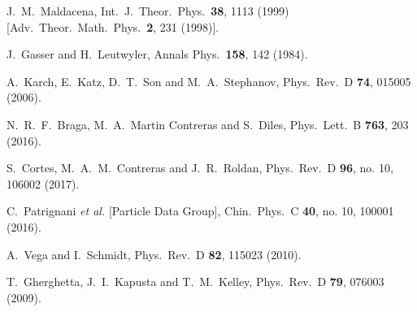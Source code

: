 \documentclass{PoS}
\begin{document}
\begin{thebibliography}{10}

  J.~M.~Maldacena,
  Int.\ J.\ Theor.\ Phys.\  {\bf 38}, 1113 (1999)
  [Adv.\ Theor.\ Math.\ Phys.\  {\bf 2}, 231 (1998)].
	
  J.~Gasser and H.~Leutwyler,
  Annals Phys.\  {\bf 158}, 142 (1984).
	
  A.~Karch, E.~Katz, D.~T.~Son and M.~A.~Stephanov,
  Phys.\ Rev.\ D {\bf 74}, 015005 (2006).
  
  N.~R.~F.~Braga, M.~A.~Martin Contreras and S.~Diles,
  Phys.\ Lett.\ B {\bf 763}, 203 (2016).

  S.~Cortes, M.~A.~M.~Contreras and J.~R.~Roldan,
  Phys.\ Rev.\ D {\bf 96}, no. 10, 106002 (2017).


  C.~Patrignani {\it et al.} [Particle Data Group],
  Chin.\ Phys.\ C {\bf 40}, no. 10, 100001 (2016).
	
  A.~Vega and I.~Schmidt,
  Phys.\ Rev.\ D {\bf 82}, 115023 (2010).

T.~Gherghetta, J.~I.~Kapusta and T.~M.~Kelley, Phys.\ Rev.\ D {\bf 79}, 076003 (2009).
	
	
	
\end{thebibliography}
\end{document}

